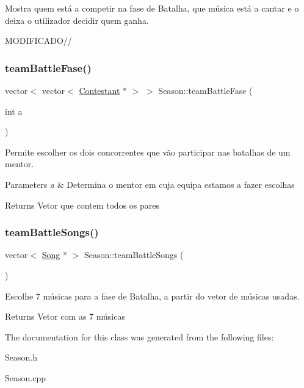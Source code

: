 Mostra quem está a competir na fase de Batalha, que música está a cantar e o deixa o utilizador decidir quem ganha. 

M\+O\+D\+I\+F\+I\+C\+A\+D\+O// \hypertarget{class_season_ac74c82ecd3f99d49a124343a4cf4d7d3}{}\label{class_season_ac74c82ecd3f99d49a124343a4cf4d7d3} 
\subsubsection{\texorpdfstring{team\+Battle\+Fase()}{teamBattleFase()}}
{\footnotesize\ttfamily vector$<$ vector$<$ \hyperlink{class_contestant}{Contestant} $\ast$ $>$ $>$ Season\+::team\+Battle\+Fase (\begin{DoxyParamCaption}\item[{int}]{a }\end{DoxyParamCaption})}



Permite escolher os dois concorrentes que vão participar nas batalhas de um mentor. 


\begin{DoxyParams}{Parameters}
{\em a} & Determina o mentor em cuja equipa estamos a fazer escolhas \\
\hline
\end{DoxyParams}
\begin{DoxyReturn}{Returns}
Vetor que contem todos os pares 
\end{DoxyReturn}
\hypertarget{class_season_ad60f552ecd0508bb86cc5d41a5c10725}{}\label{class_season_ad60f552ecd0508bb86cc5d41a5c10725} 
\subsubsection{\texorpdfstring{team\+Battle\+Songs()}{teamBattleSongs()}}
{\footnotesize\ttfamily vector$<$ \hyperlink{class_song}{Song} $\ast$ $>$ Season\+::team\+Battle\+Songs (\begin{DoxyParamCaption}{ }\end{DoxyParamCaption})}



Escolhe 7 músicas para a fase de Batalha, a partir do vetor de músicas usadas. 

\begin{DoxyReturn}{Returns}
Vetor com as 7 músicas 
\end{DoxyReturn}


The documentation for this class was generated from the following files\+:\begin{DoxyCompactItemize}
\item 
Season.\+h\item 
Season.\+cpp\end{DoxyCompactItemize}
